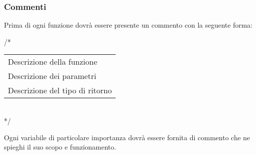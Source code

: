 \subsubsection{Commenti}

Prima di ogni funzione dovrà essere presente un commento con la seguente forma:

\begin{flushleft}
/*\\
\vspace{3mm}
\begin{tabular}{l}
	Descrizione della funzione\\
	Descrizione dei parametri\\		
	Descrizione del tipo di ritorno\\
\end{tabular}\\
\vspace{3mm}
*/

\end{flushleft}

Ogni variabile di particolare importanza dovrà essere fornita di commento che ne spieghi il suo scopo e funzionamento.

